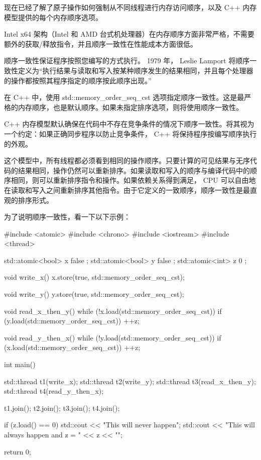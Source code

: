 现在已经了解了原子操作如何强制从不同线程进行内存访问顺序，以及 C++ 内存模型提供的每个内存顺序选项。

Intel x64 架构（Intel 和 AMD 台式机处理器）在内存顺序方面非常严格，不需要额外的获取/释放指令，并且顺序一致性在性能成本方面很低。


顺序一致性保证程序按照您编写的方式执行。 1979 年， Leslie Lamport 将顺序一致性定义为“执行结果与读取和写入按某种顺序发生的结果相同，并且每个处理器的操作都按照其程序指定的顺序按此顺序出现。”

在 C++ 中，使用 std::memory\_order\_seq\_cst 选项指定顺序一致性。这是最严格的内存顺序，也是默认顺序。如果未指定排序选项，则将使用顺序一致性。

C++ 内存模型默认确保在代码中不存在竞争条件的情况下顺序一致性。将其视为一个约定：如果正确同步程序以防止竞争条件， C++ 将保持程序按编写顺序执行的外观。

这个模型中，所有线程都必须看到相同的操作顺序。只要计算的可见结果与无序代码的结果相同，操作仍然可以重新排序。如果读取和写入的顺序与编译代码中的顺序相同，则可以重新排序指令和操作。如果依赖关系得到满足， CPU 可以自由地在读取和写入之间重新排序其他指令。由于它定义的一致顺序，顺序一致性是最直观的排序形式。

为了说明顺序一致性，看一下以下示例：

\begin{cpp}
#include <atomic>
#include <chrono>
#include <iostream>
#include <thread>

std::atomic<bool> x{ false };
std::atomic<bool> y{ false };
std::atomic<int> z{ 0 };

void write_x() {
    x.store(true, std::memory_order_seq_cst);
}

void write_y() {
    y.store(true, std::memory_order_seq_cst);
}

void read_x_then_y() {
    while (!x.load(std::memory_order_seq_cst)) {}
    if (y.load(std::memory_order_seq_cst)) {
        ++z;
    }
}

void read_y_then_x()
{
    while (!y.load(std::memory_order_seq_cst)) {}
    if (x.load(std::memory_order_seq_cst)) {
        ++z;
    }
}

int main() {
    std::thread t1(write_x);
    std::thread t2(write_y);
    std::thread t3(read_x_then_y);
    std::thread t4(read_y_then_x);

    t1.join();
    t2.join();
    t3.join();
    t4.join();

    if (z.load() == 0) {
        std::cout << "This will never happen\n";
    }
    {
        std::cout << "This will always happen and z = " << z << "\n";
    }

    return 0;
}
\end{cpp}

